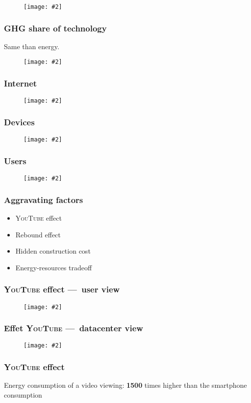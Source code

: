 \documentclass[10pt]{beamer}
\newcommand{\imgtw}[2][1]{%
  \begin{figure}%
    \centering%
    \texttt{[image: \#2]}%
  \end{figure}%
}
\newcommand{\imgth}[2][1]{%
  \begin{figure}%
    \centering%
    \texttt{[image: \#2]}%
  \end{figure}%
}
\begin{document}
\begin{frame}[standout]
  \imgth{lean-energy-share}
\end{frame}

\begin{frame}
  \frametitle{GHG share of technology}

  Same than energy.
\end{frame}

\begin{frame}[standout]
  \imgtw{lean-ghg-share}
\end{frame}

\begin{frame}[standout]
  \frametitle{Internet}

  \imgtw{lean-exabytes}
\end{frame}

\begin{frame}[standout]
  \frametitle{Devices}
  \imgtw{lean-devices}
\end{frame}

\begin{frame}[standout]
  \frametitle{Users}

  \imgth[.9]{lean-connection}
\end{frame}

\begin{frame}
  \frametitle{Aggravating factors}
  \begin{itemize}
  \item \textsc{YouTube} effect
  \item Rebound effect
  \item Hidden construction cost
  \item Energy-resources tradeoff
  \end{itemize}
\end{frame}

\begin{frame} 
  \frametitle{\textsc{YouTube} effect ---~user view}

  \imgtw[.9]{youtube-phone}
\end{frame}

\begin{frame}
  \frametitle{Effet \textsc{YouTube} ---~datacenter view}

  \imgtw{datacenter}
\end{frame}

\begin{frame}
  \frametitle{\textsc{YouTube} effect}

  Energy consumption of a video viewing: \textbf{1500} times higher
  than the smartphone consumption
\end{frame}
\end{document}
